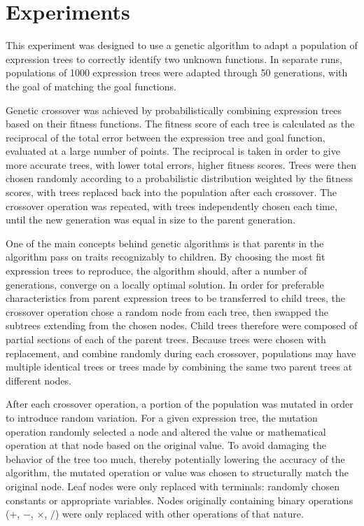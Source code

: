 
\section{Experiments}
\label{sec:expts}

This experiment was designed to use a genetic algorithm to adapt a population of expression trees to correctly identify two unknown functions.  In separate runs, populations of 1000 expression trees were adapted through 50 generations, with the goal of matching the goal functions.

Genetic crossover was achieved by probabilistically combining expression trees based on their fitness functions.  The fitness score of each tree is calculated as the reciprocal of the total error between the expression tree and goal function, evaluated at a large number of points.  The reciprocal is taken in order to give more accurate trees, with lower total errors, higher fitness scores.  Trees were then chosen randomly according to a probabilistic distribution weighted by the fitness scores, with trees replaced back into the population after each crossover.  The crossover operation was repeated, with trees independently chosen each time, until the new generation was equal in size to the parent generation.

One of the main concepts behind genetic algorithms is that parents in the algorithm pass on traits recognizably to children.  By choosing the most fit expression trees to reproduce, the algorithm should, after a number of generations, converge on a locally optimal solution. In order for preferable characteristics from parent expression trees to be transferred to child trees, the crossover operation chose a random node from each tree, then swapped the subtrees extending from the chosen nodes.  Child trees therefore were composed of partial sections of each of the parent trees.  Because trees were chosen with replacement, and combine randomly during each crossover, populations may have multiple identical trees or trees made by combining the same two parent trees at different nodes.

After each crossover operation, a portion of the population was mutated in order to introduce random variation. For a given expression tree, the mutation operation randomly selected a node and altered the value or mathematical operation at that node based on the original value.  To avoid damaging the behavior of the tree too much, thereby potentially lowering the accuracy of the algorithm, the mutated operation or value was chosen to structurally match the original node.  Leaf nodes were only replaced with terminals: randomly chosen constants or appropriate variables.  Nodes originally containing binary operations ($+$, $-$, $\times$, $/$) were only replaced with other operations of that nature.

